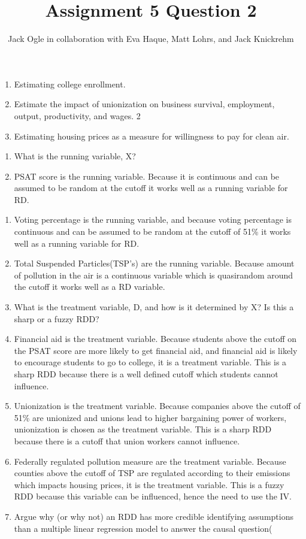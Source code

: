 \documentclass[
  12pt,
  landscape]{article}
\title{Assignment 5 Question 2}
\author{Jack Ogle in collaboration with Eva Haque, Matt Lohrs, and Jack
Knickrehm}
\date{}
\providecommand{\tightlist}{%
  \setlength{\itemsep}{0pt}\setlength{\parskip}{0pt}}
\begin{document}
\maketitle

\begin{enumerate}
\def\labelenumi{\roman{enumi})}
\tightlist
\item
  Estimating college enrollment.
\item
  Estimate the impact of unionization on business survival, employment,
  output, productivity, and wages. 2
\item
  Estimating housing prices as a measure for willingness to pay for
  clean air.
\end{enumerate}

\begin{enumerate}
\def\labelenumi{\alph{enumi})}
\setcounter{enumi}{1}
\tightlist
\item
  What is the running variable, X?
\item
  PSAT score is the running variable. Because it is continuous and can
  be assumed to be random at the cutoff it works well as a running
  variable for RD.
\end{enumerate}

\begin{enumerate}
\def\labelenumi{\roman{enumi})}
\setcounter{enumi}{1}
\tightlist
\item
  Voting percentage is the running variable, and because voting
  percentage is continuous and can be assumed to be random at the cutoff
  of 51\% it works well as a running variable for RD.
\item
  Total Suspended Particles(TSP's) are the running variable. Because
  amount of pollution in the air is a continuous variable which is
  quasirandom around the cutoff it works well as a RD variable.
\item
  What is the treatment variable, D, and how is it determined by X? Is
  this a sharp or a fuzzy RDD?
\item
  Financial aid is the treatment variable. Because students above the
  cutoff on the PSAT score are more likely to get financial aid, and
  financial aid is likely to encourage students to go to college, it is
  a treatment variable. This is a sharp RDD because there is a well
  defined cutoff which students cannot influence.
\item
  Unionization is the treatment variable. Because companies above the
  cutoff of 51\% are unionized and unions lead to higher bargaining
  power of workers, unionization is chosen as the treatment variable.
  This is a sharp RDD because there is a cutoff that union workers
  cannot influence.
\item
  Federally regulated pollution measure are the treatment variable.
  Because counties above the cutoff of TSP are regulated according to
  their emissions which impacts housing prices, it is the treatment
  variable. This is a fuzzy RDD because this variable can be influenced,
  hence the need to use the IV.
\item
  Argue why (or why not) an RDD has more credible identifying
  assumptions than a multiple linear regression model to answer the
  causal question(
\end{enumerate}
\end{document}
